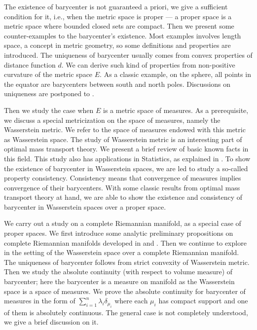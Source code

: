 The existence of barycenter is not guaranteed a priori,
we give a sufficient condition for it,
i.e., when the metric space is proper ---
a proper space is a metric space where bounded closed sets are compact.
Then we present some counter-examples to the barycenter's existence.
Most examples involves length space, a concept in metric geometry,
so some definitions and properties are introduced.
The uniqueness of barycenter usually comes from convex properties of distance function $d$.
We can derive such kind of properties from non-positive curvature of the metric space $E$.
As a classic example, on the sphere,
all points in the equator are barycenters
between south and north poles.
Discussions on uniqueness are postponed to .

Then we study the case when $E$ is a metric space of measures.
As a prerequisite, we discuss a special metricization on the space of measures,
namely the Wasserstein metric.
We refer to the space of measures endowed with this metric as Wasserstein space.
The study of Wasserstein metric is an interesting part of optimal mass transport theory.
We present a brief review of basic known facts in this field.
This study also has applications in Statistics, as explained in \cite{le2017existence}.
To show the existence of barycenter in Wasserstein spaces,
we are led to study a so-called property consistency.
Consistency means that convergence of measures implies convergence of their barycenters.
With some classic results from optimal mass transport theory at hand,
we are able to show the existence and consistency of barycenter in Wasserstein spaces over a proper space.

We carry out a study on a complete Riemannian manifold,
as a special case of proper spaces.
We first introduce some analytic preliminary propositions on
complete Riemannian manifolds developed in \cite{mccann2001polar} and \cite{cordero2001riemannian}.
Then we continue to explore in the setting of the Wasserstein space over a complete Riemannian manifold.
The uniqueness of barycenter follows from strict convexity of Wasserstein metric.
Then we study the
absolute continuity (with respect to volume measure) of barycenter;
here the barycenter is a measure on manifold as the Wasserstein space is a space of measures.
We prove the absolute continuity for barycenter of measures in the form of
$\sum_{i=1}^{n} \lambda_i \delta_{\mu_i}$ where each $\mu_i$ has compact support and one of them is absolutely continuous.
The general case is not completely understood, we give a brief discussion on it.

